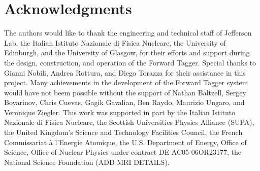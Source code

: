\section*{Acknowledgments}

The authors would like to thank the engineering and technical staff of Jefferson Lab, the Italian Istituto
Nazionale di Fisica Nucleare, the University of Edinburgh, and the University of Glasgow, for their efforts
and support during the design, construction, and operation of the Forward Tagger. Special thanks to Gianni Nobili,
Andrea Rottura, and Diego Torazza for their assistance in this project. Many achievements in the development of the Forward
Tagger system would have not beem possible without the support of Nathan Baltzell, Sergey Boyarinov, Chris Cuevas,
Gagik Gavalian, Ben Raydo, Maurizio Ungaro, and Veronique Ziegler. This work was supported in part by the Italian
Istituto Nazionale di Fisica Nucleare, the Scottish Universities Physics Alliance (SUPA), the United Kingdom's Science
and Technology Facilities Council, the French Commissariat \`{a} l'Energie Atomique, the U.S. Department of Energy,
Office of Science, Office of Nuclear Physics under contract DE-AC05-06OR23177, the National Science Foundation
(ADD MRI DETAILS). 
